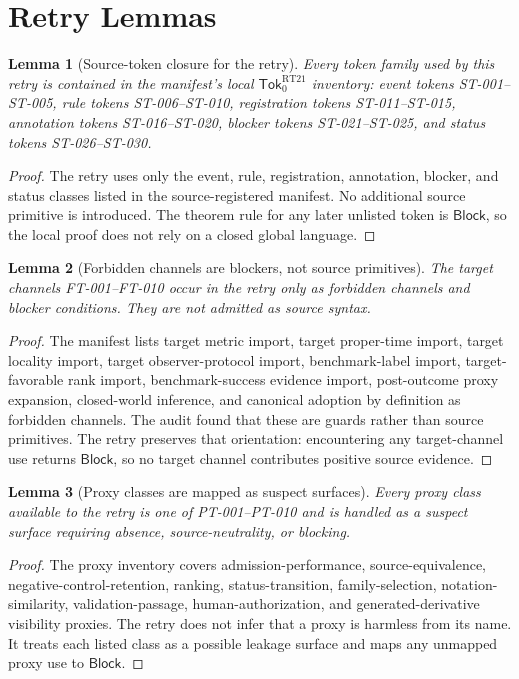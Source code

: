 \documentclass[11pt]{article}
\newcommand{\SrcTok}{\mathsf{Tok}_{0}}
\newcommand{\Block}{\mathsf{Block}}
\newtheorem{lemma}{Lemma}
\begin{document}
\section{Retry Lemmas}

\begin{lemma}[Source-token closure for the retry]
Every token family used by this retry is contained in the manifest's local
\(\SrcTok^{\mathrm{RT21}}\) inventory: event tokens ST-001--ST-005, rule
tokens ST-006--ST-010, registration tokens ST-011--ST-015, annotation
tokens ST-016--ST-020, blocker tokens ST-021--ST-025, and status tokens
ST-026--ST-030.
\end{lemma}

\begin{proof}
The retry uses only the event, rule, registration, annotation, blocker, and
status classes listed in the source-registered manifest. No additional
source primitive is introduced. The theorem rule for any later unlisted
token is \(\Block\), so the local proof does not rely on a closed global
language.
\end{proof}

\begin{lemma}[Forbidden channels are blockers, not source primitives]
The target channels FT-001--FT-010 occur in the retry only as forbidden
channels and blocker conditions. They are not admitted as source syntax.
\end{lemma}

\begin{proof}
The manifest lists target metric import, target proper-time import, target
locality import, target observer-protocol import, benchmark-label import,
target-favorable rank import, benchmark-success evidence import,
post-outcome proxy expansion, closed-world inference, and canonical
adoption by definition as forbidden channels. The audit found that these
are guards rather than source primitives. The retry preserves that
orientation: encountering any target-channel use returns \(\Block\), so no
target channel contributes positive source evidence.
\end{proof}

\begin{lemma}[Proxy classes are mapped as suspect surfaces]
Every proxy class available to the retry is one of PT-001--PT-010 and is
handled as a suspect surface requiring absence, source-neutrality, or
blocking.
\end{lemma}

\begin{proof}
The proxy inventory covers admission-performance, source-equivalence,
negative-control-retention, ranking, status-transition, family-selection,
notation-similarity, validation-passage, human-authorization, and
generated-derivative visibility proxies. The retry does not infer that a
proxy is harmless from its name. It treats each listed class as a possible
leakage surface and maps any unmapped proxy use to \(\Block\).
\end{proof}
\end{document}
